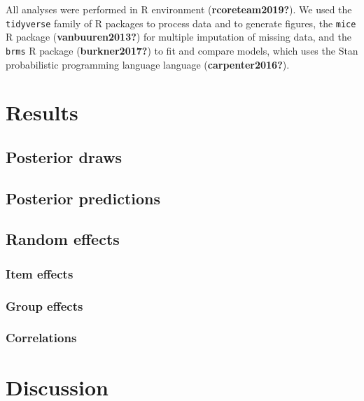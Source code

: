 \documentclass[
  english,
  man]{apa6}
\begin{document}
All analyses were performed in R environment (\textbf{rcoreteam2019?}). We used the \texttt{tidyverse} family of R packages to process data and to generate figures, the \texttt{mice} R package (\textbf{vanbuuren2013?}) for multiple imputation of missing data, and the \texttt{brms} R package (\textbf{burkner2017?}) to fit and compare models, which uses the Stan probabilistic programming language language (\textbf{carpenter2016?}).

\hypertarget{results}{%
\section{Results}\label{results}}

\hypertarget{posterior-draws}{%
\subsection{Posterior draws}\label{posterior-draws}}

\hypertarget{posterior-predictions}{%
\subsection{Posterior predictions}\label{posterior-predictions}}

\hypertarget{random-effects}{%
\subsection{Random effects}\label{random-effects}}

\hypertarget{item-effects}{%
\subsubsection{Item effects}\label{item-effects}}

\hypertarget{group-effects}{%
\subsubsection{Group effects}\label{group-effects}}

\hypertarget{correlations}{%
\subsubsection{Correlations}\label{correlations}}

\hypertarget{discussion}{%
\section{Discussion}\label{discussion}}
\end{document}
